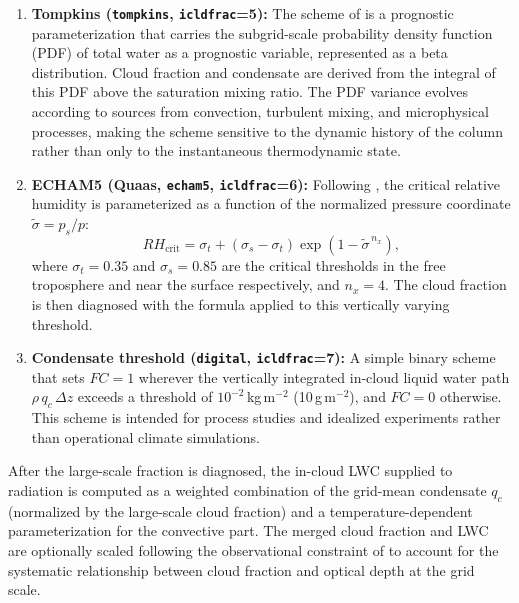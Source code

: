 {{\begin{enumerate}
\item {\bf Tompkins (\texttt{tompkins}, \texttt{icldfrac}=5):} The scheme of \citet{tompkins:02}
is a prognostic parameterization that carries the subgrid-scale probability
density function (PDF) of total water as a prognostic variable, represented
as a beta distribution. Cloud fraction and condensate are derived from the
integral of this PDF above the saturation mixing ratio. The PDF variance
evolves according to sources from convection, turbulent mixing, and
microphysical processes, making the scheme sensitive to the dynamic history
of the column rather than only to the instantaneous thermodynamic state.\\

\item {\bf ECHAM5 (Quaas, \texttt{echam5}, \texttt{icldfrac}=6):} Following \citet{Quaas_04},
the critical relative humidity is parameterized as a function of the
normalized pressure coordinate $\tilde{\sigma} = p_s / p$:
\begin{equation}
  RH_\mathrm{crit} = \sigma_t + \left(\sigma_s - \sigma_t\right)
                     \exp\!\left(1 - \tilde{\sigma}^{\,n_x}\right),
\end{equation}
where $\sigma_t = 0.35$ and $\sigma_s = 0.85$ are the critical thresholds in
the free troposphere and near the surface respectively, and $n_x = 4$. The
cloud fraction is then diagnosed with the \citet{Sundqvist_88} formula applied
to this vertically varying threshold.\\

\item {\bf Condensate threshold (\texttt{digital}, \texttt{icldfrac}=7):} A simple binary
scheme that sets $FC = 1$ wherever the vertically integrated in-cloud liquid
water path $\rho\,q_c\,\Delta z$ exceeds a threshold of
$10^{-2}$\,kg\,m$^{-2}$ (10\,g\,m$^{-2}$), and $FC = 0$ otherwise. This
scheme is intended for process studies and idealized experiments rather than
operational climate simulations.\\

\end{enumerate}
}

\noindent After the large-scale fraction is diagnosed, the in-cloud LWC
supplied to radiation is computed as a weighted combination of the
grid-mean condensate $q_c$ (normalized by the large-scale cloud fraction)
and a temperature-dependent parameterization for the convective part. The
merged cloud fraction and LWC are optionally scaled following the
observational constraint of \citet{Liang_05} to account for the systematic
relationship between cloud fraction and optical depth at the grid scale.

}
